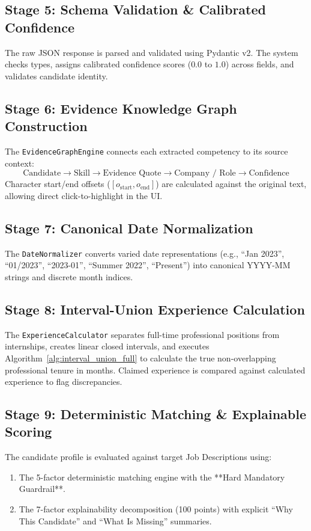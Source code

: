\documentclass[11pt,a4paper]{report}
\begin{document}
\subsection{Stage 5: Schema Validation \& Calibrated Confidence}
The raw JSON response is parsed and validated using Pydantic v2. The system checks types, assigns calibrated confidence scores ($0.0$ to $1.0$) across fields, and validates candidate identity.

\subsection{Stage 6: Evidence Knowledge Graph Construction}
The \texttt{EvidenceGraphEngine} connects each extracted competency to its source context:
\begin{equation}
    \text{Candidate} \longrightarrow \text{Skill} \longrightarrow \text{Evidence Quote} \longrightarrow \text{Company / Role} \longrightarrow \text{Confidence}
\end{equation}
Character start/end offsets ($[o_{\text{start}}, o_{\text{end}}]$) are calculated against the original text, allowing direct click-to-highlight in the UI.

\subsection{Stage 7: Canonical Date Normalization}
The \texttt{DateNormalizer} converts varied date representations (e.g., ``Jan 2023'', ``01/2023'', ``2023-01'', ``Summer 2022'', ``Present'') into canonical YYYY-MM strings and discrete month indices.

\subsection{Stage 8: Interval-Union Experience Calculation}
The \texttt{ExperienceCalculator} separates full-time professional positions from internships, creates linear closed intervals, and executes Algorithm~\ref{alg:interval_union_full} to calculate the true non-overlapping professional tenure in months. Claimed experience is compared against calculated experience to flag discrepancies.

\subsection{Stage 9: Deterministic Matching \& Explainable Scoring}
The candidate profile is evaluated against target Job Descriptions using:
\begin{enumerate}[label=\textbf{(\arabic*)}]
    \item The 5-factor deterministic matching engine with the **Hard Mandatory Guardrail**.
    \item The 7-factor explainability decomposition (100 points) with explicit ``Why This Candidate'' and ``What Is Missing'' summaries.
\end{enumerate}
\end{document}
